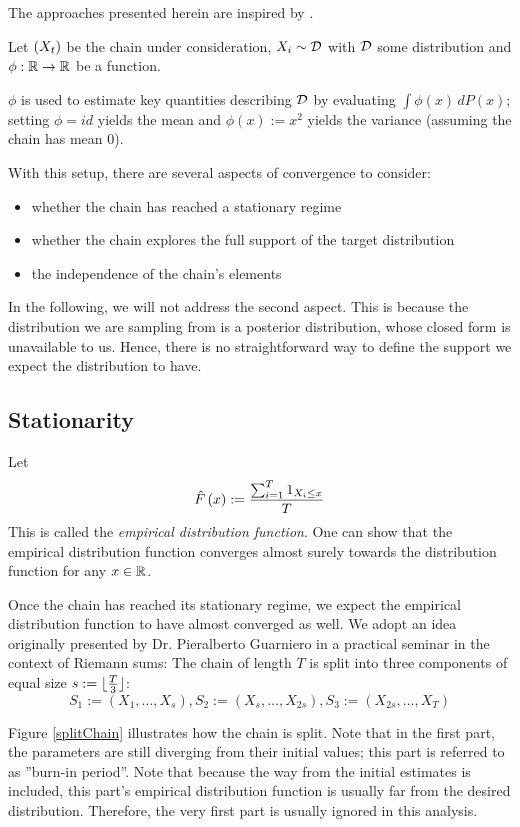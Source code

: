 
The approaches presented herein are inspired by \cite{mcnotes}.



Let $\left(X_t\right)$ be the chain under consideration, $X_i \sim \mathcal{D}$ with $\mathcal{D}$ some distribution and $\phi : \mathbb{R} \rightarrow \mathbb{R}$ be a function. 

$\phi$ is used to estimate key quantities describing $\mathcal{D}$ by evaluating $\int \phi(x) \, dP(x)$; setting $\phi = id$ yields the mean and $\phi(x) := x^2$ yields the variance (assuming the chain has mean $0$).

 
With this setup, there are several aspects of convergence to consider: 
\begin{itemize}
	\item whether the chain has reached a stationary regime
	\item whether the chain explores the full support of the target distribution 
	\item the independence of the chain's elements 
\end{itemize}

In the following, we will not address the second aspect. This is because the distribution we are sampling from is a posterior distribution, whose closed form is unavailable to us. Hence, there is no straightforward way to define the support we expect the distribution to have.

\subsection{Stationarity}
Let 
\[
	\hat{F}\left(x\right) := \frac{\sum_{i=1}^T 1_{X_i \leq x}}{T}
\]
This is called the \textit{empirical distribution function}. One can show that the empirical distribution function converges almost surely towards the distribution function for any $x \in \mathbb{R}$. 

Once the chain has reached its stationary regime, we expect the empirical distribution function to have almost converged as well. We adopt an idea originally presented by Dr. Pieralberto Guarniero in a practical seminar in the context of Riemann sums: 
The chain of length $T$ is split into three components of equal size $s := \lfloor \frac{T}{3} \rfloor$: 
\[
S_1 := \left(X_1, \dots, X_s\right), S_2 := \left(X_s, \dots, X_{2s}\right), S_3 := \left(X_{2s}, \dots, X_T\right)
\] 

Figure \ref{splitChain} illustrates how the chain is split. Note that in the first part, the parameters are still diverging from their initial values; this part is referred to as  ''burn-in period''. Note that because the way from the initial estimates is included, this part's empirical distribution function is usually far from the desired distribution. Therefore, the very first part is usually ignored in this analysis.

